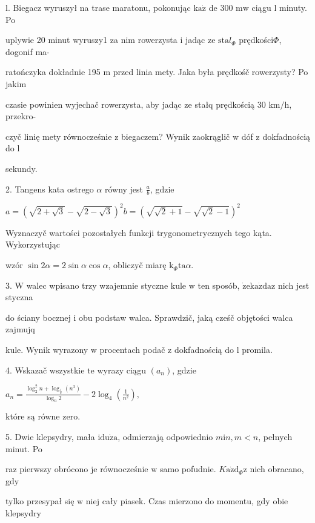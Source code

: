 \documentclass[a4paper,12pt]{article}
\begin{document}
l. Biegacz wyruszył na trase maratonu, pokonując $\mathrm{k}\mathrm{a}\dot{\mathrm{z}}$ de 300 $\mathrm{m} \mathrm{w}$ ciągu l minuty. Po

uplywie 20 minut wyruszy1 za nim rowerzysta $\mathrm{i}$ jadąc ze $\mathrm{s}\mathrm{t}\mathrm{a}l_{\Phi}$ prędkości$\Phi$, dogonif ma-

ratończyka dokładnie 195 $\mathrm{m}$ przed linia mety. Jaka była prędkośč rowerzysty? Po jakim

czasie powinien wyjechač rowerzysta, aby jadąc ze stałq prędkością 30 $\mathrm{k}\mathrm{m}/\mathrm{h}$, przekro-

czyč linię mety równocześnie $\mathrm{z}$ biegaczem? Wynik zaokrąglič $\mathrm{w}$ dóf $\mathrm{z}$ dokfadnością do l

sekundy.

2. Tangens kata ostrego $\alpha$ równy jest $\displaystyle \frac{a}{b}$, gdzie

$a=(\sqrt{2+\sqrt{3}}-\sqrt{2-\sqrt{3}})^{2}b=(\sqrt{\sqrt{2}+1}-\sqrt{\sqrt{2}-1})^{2}$

Wyznaczyč wartości pozostałych funkcji trygonometrycznych tego kąta. Wykorzystując

wzór $\sin 2\alpha=2\sin\alpha\cos\alpha$, obliczyč miarę $\mathrm{k}_{\Phi}\mathrm{t}\mathrm{a}\alpha.$

3. $\mathrm{W}$ walec wpisano trzy wzajemnie styczne kule $\mathrm{w}$ ten sposób, $\dot{\mathrm{z}}\mathrm{e}\mathrm{k}\mathrm{a}\dot{\mathrm{z}}\mathrm{d}\mathrm{a}\mathrm{z}$ nich jest styczna

do ściany bocznej $\mathrm{i}$ obu podstaw walca. Sprawdzič, jaką cześč objętości walca zajmujq

kule. Wynik wyrazony $\mathrm{w}$ procentach podač $\mathrm{z}$ dokfadnością do l promila.

4. Wskazač wszystkie $\mathrm{t}\mathrm{e}$ wyrazy ciągu $(a_{n})$, gdzie

$a_{n}=\displaystyle \frac{\log_{2}^{2}n+\log_{\frac{1}{2}}(n^{3})}{\log_{n}2}-2\log_{4}(\frac{1}{n^{2}}),$

które są równe zero.

5. Dwie klepsydry, mała $\mathrm{i}\mathrm{d}\mathrm{u}\dot{\mathrm{z}}\mathrm{a}$, odmierzają odpowiednio $m\mathrm{i}n, m<n$, pełnych minut. Po

raz pierwszy obrócono je równocześnie $\mathrm{w}$ samo pofudnie. $K\mathrm{a}\dot{\mathrm{z}}\mathrm{d}_{\Phi}\mathrm{z}$ nich obracano, gdy

tylko przesypał się $\mathrm{w}$ niej cały piasek. Czas mierzono do momentu, gdy obie klepsydry
\end{document}
